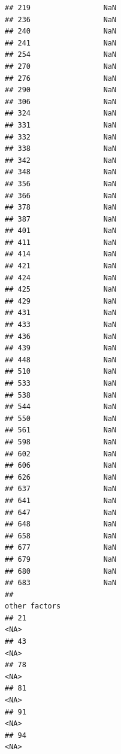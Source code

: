 \documentclass[
]{article}
\begin{document}
\begin{verbatim}
## 219                 NaN
## 236                 NaN
## 240                 NaN
## 241                 NaN
## 254                 NaN
## 270                 NaN
## 276                 NaN
## 290                 NaN
## 306                 NaN
## 324                 NaN
## 331                 NaN
## 332                 NaN
## 338                 NaN
## 342                 NaN
## 348                 NaN
## 356                 NaN
## 366                 NaN
## 378                 NaN
## 387                 NaN
## 401                 NaN
## 411                 NaN
## 414                 NaN
## 421                 NaN
## 424                 NaN
## 425                 NaN
## 429                 NaN
## 431                 NaN
## 433                 NaN
## 436                 NaN
## 439                 NaN
## 448                 NaN
## 510                 NaN
## 533                 NaN
## 538                 NaN
## 544                 NaN
## 550                 NaN
## 561                 NaN
## 598                 NaN
## 602                 NaN
## 606                 NaN
## 626                 NaN
## 637                 NaN
## 641                 NaN
## 647                 NaN
## 648                 NaN
## 658                 NaN
## 677                 NaN
## 679                 NaN
## 680                 NaN
## 683                 NaN
##                                                                                                                                                                                        other factors
## 21                                                                                                                                                                                              <NA>
## 43                                                                                                                                                                                              <NA>
## 78                                                                                                                                                                                              <NA>
## 81                                                                                                                                                                                              <NA>
## 91                                                                                                                                                                                              <NA>
## 94                                                                                                                                                                                              <NA>

\end{verbatim}
\end{document}
